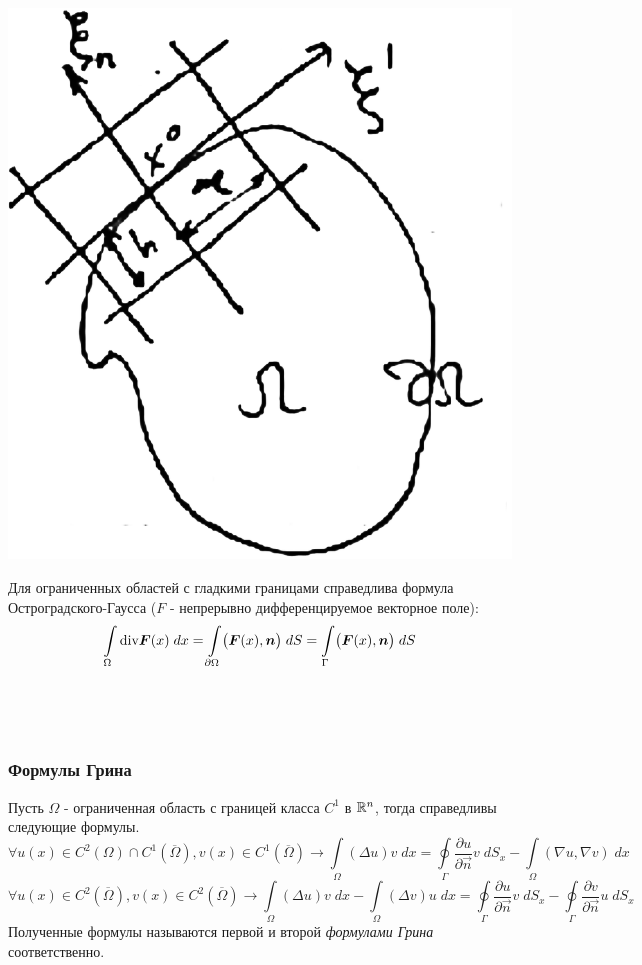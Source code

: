 \begin{minipage}{0.3\textwidth}
\begin{center}
\includegraphics[scale = 0.2]{14_1_new}
\end{center}
\end{minipage}
\begin{minipage}{0.8\textwidth}
Для ограниченных областей с гладкими границами справедлива формула Остроградского-Гаусса ($F$ - непрерывно дифференцируемое векторное поле):
$$\int\limits_{\Omega} \text{div} \boldsymbol{F}(x)\;dx = \int\limits_{\partial \Omega} \bigl(\boldsymbol{F}(x), \boldsymbol{n}\bigr)\;dS = \int\limits_{\Gamma} \bigl(\boldsymbol{F}(x), \boldsymbol{n}\bigr)\;dS$$
\end{minipage} \\
\begin{lemma} \ \\
\subsubsection{Формулы Грина}
Пусть $\Omega$ - ограниченная область с границей класса $C^1$ в $\mathbb{R}^n$, тогда справедливы следующие формулы.
	$$\forall u(x) \in C^2(\Omega)\cap C^1(\overline{\Omega}), v(x) \in C^1(\overline{\Omega}) \to \int\limits_{\Omega} (\Delta u)v\; dx = \oint\limits_{\Gamma} \dfrac{\partial u}{\partial \vec{n}} v\;dS_x - \int\limits_{\Omega}(\nabla u, \nabla v)\;dx $$
$$ \forall u(x) \in C^2(\overline{\Omega}), v(x) \in C^2(\overline{\Omega}) \to \int\limits_{\Omega} (\Delta u)v\; dx - \int\limits_{\Omega} (\Delta v)u\; dx = \oint\limits_{\Gamma} \dfrac{\partial u}{\partial \vec{n}} v\;dS_x - \oint\limits_{\Gamma} \dfrac{\partial v}{\partial \vec{n}} u\;dS_x$$
Полученные формулы называются первой и второй\; \textit{формулами Грина} соответственно.
\end{lemma}
